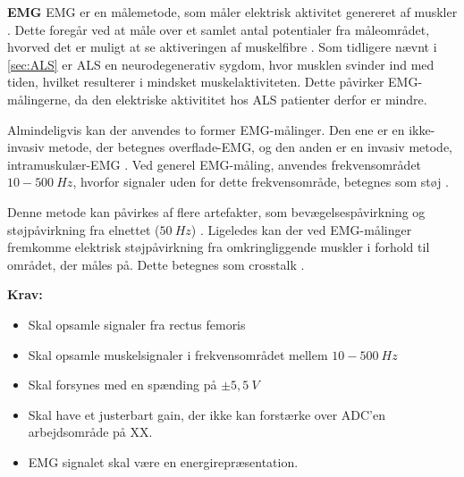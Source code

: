 \textbf{EMG}
EMG er en målemetode, som måler elektrisk aktivitet genereret af muskler \citep{chowdhury2013}. 
Dette foregår ved at måle over et samlet antal potentialer fra måleområdet, hvorved det er muligt at se aktiveringen af muskelfibre \citep{keenan2012}. Som tidligere nævnt i \autoref{sec:ALS} er ALS en neurodegenerativ sygdom, hvor musklen svinder ind med tiden, hvilket resulterer i mindsket muskelaktiviteten. Dette påvirker EMG-målingerne, da den elektriske aktivititet hos ALS patienter derfor er mindre.

Almindeligvis kan der anvendes to former EMG-målinger. Den ene er en ikke-invasiv metode, der betegnes overflade-EMG, og den anden er en invasiv metode, intramuskulær-EMG \citep{chowdhury2013, keenan2012}.
Ved generel EMG-måling, anvendes frekvensområdet $10-500~Hz$, hvorfor signaler uden for dette frekvensområde, betegnes som støj \citep{morre2003, keenan2012}.  

Denne metode kan påvirkes af flere artefakter, som bevægelsespåvirkning og støjpåvirkning fra elnettet ($50~Hz$) \citep{keenan2012}.
Ligeledes kan der ved EMG-målinger fremkomme elektrisk støjpåvirkning fra omkringliggende muskler i forhold til området, der måles på. Dette betegnes som crosstalk \citep{keenan2012}. 
\vspace{3mm}

\textbf{Krav:}
\begin{itemize}
\item Skal opsamle signaler fra rectus femoris
\item Skal opsamle muskelsignaler i frekvensområdet mellem $10-500~Hz$
\item Skal forsynes med en spænding på $\pm5,5~V$ 
\item Skal have et justerbart gain, der ikke kan forstærke over ADC'en arbejdsområde på XX.
\item EMG signalet skal være en energirepræsentation.
\end{itemize}